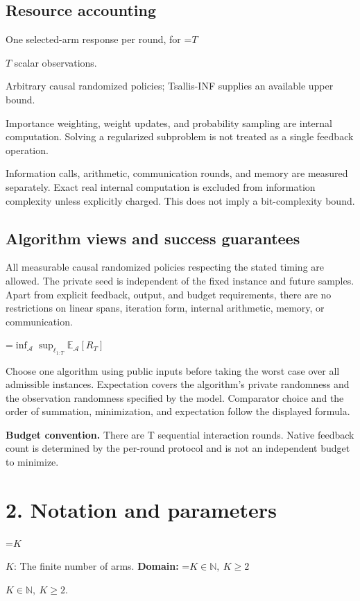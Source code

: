 \documentclass[10pt,a4paper]{article}
\newcommand{\AtlasMath}[1]{\par\begingroup\centering\setbox0=\hbox{$\displaystyle #1$}\ifdim\wd0>1.4\linewidth\typeout{ATLAS WIDE FORMULA: \the\wd0}\fi\ifdim\wd0>\linewidth\resizebox{\linewidth}{!}{\box0}\else\box0\fi\par\endgroup}
\newcommand{\AtlasInlineMath}[1]{\begingroup\setbox0=\hbox{$#1$}\ifdim\wd0>.4\linewidth\endgroup\AtlasMath{#1}\else\endgroup$#1$\fi}
\begin{document}
\subsection{Resource accounting}
One selected-arm response per round, for \AtlasInlineMath{T} scalar observations.

Arbitrary causal randomized policies; Tsallis-INF supplies an available upper bound.

Importance weighting, weight updates, and probability sampling are internal computation. Solving a regularized subproblem is not treated as a single feedback operation.

Information calls, arithmetic, communication rounds, and memory are measured separately. Exact real internal computation is excluded from information complexity unless explicitly charged. This does not imply a bit-complexity bound.

\subsection{Algorithm views and success guarantees}
All measurable causal randomized policies respecting the stated timing are allowed. The private seed is independent of the fixed instance and future samples. Apart from explicit feedback, output, and budget requirements, there are no restrictions on linear spans, iteration form, internal arithmetic, memory, or communication.


\AtlasMath{\inf_{\mathcal{A}}\sup_{\ell_{1:T}}\mathbb{E}_{\mathcal{A}}[R_T]}


Choose one algorithm using public inputs before taking the worst case over all admissible instances. Expectation covers the algorithm's private randomness and the observation randomness specified by the model. Comparator choice and the order of summation, minimization, and expectation follow the displayed formula.

\textbf{Budget convention.} There are T sequential interaction rounds. Native feedback count is determined by the per-round protocol and is not an independent budget to minimize.

\section{2. Notation and parameters}
\AtlasInlineMath{K}: The finite number of arms. \textbf{Domain:} \AtlasInlineMath{K\in\mathbb N,\ K\ge2}.
\end{document}
